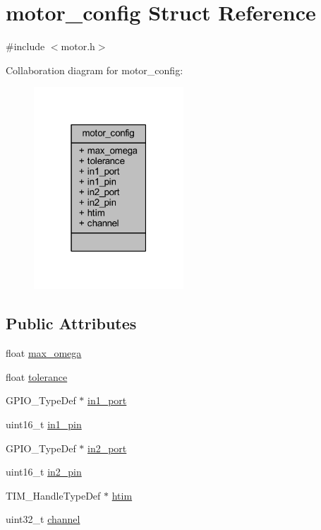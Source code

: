 \hypertarget{structmotor__config}{}\section{motor\+\_\+config Struct Reference}
\label{structmotor__config}


{\ttfamily \#include $<$motor.\+h$>$}



Collaboration diagram for motor\+\_\+config\+:
\nopagebreak
\begin{figure}[H]
\begin{center}
\leavevmode
\includegraphics[width=159pt]{structmotor__config__coll__graph}
\end{center}
\end{figure}
\subsection*{Public Attributes}
\begin{DoxyCompactItemize}
\item 
float \mbox{\hyperlink{structmotor__config_a88fc8ca47e3b231b22a03499cf7dc1c5}{max\+\_\+omega}}
\item 
float \mbox{\hyperlink{structmotor__config_a65896f970ca53f058d57ec2fc5188719}{tolerance}}
\item 
G\+P\+I\+O\+\_\+\+Type\+Def $\ast$ \mbox{\hyperlink{structmotor__config_a954fcd761395de38e251e7052126fe37}{in1\+\_\+port}}
\item 
uint16\+\_\+t \mbox{\hyperlink{structmotor__config_ab96ecf85a5bee0e13f1be1ac799ee24b}{in1\+\_\+pin}}
\item 
G\+P\+I\+O\+\_\+\+Type\+Def $\ast$ \mbox{\hyperlink{structmotor__config_a4b46a55de08e33e2e7a7f255568dfd7b}{in2\+\_\+port}}
\item 
uint16\+\_\+t \mbox{\hyperlink{structmotor__config_ab494f14e301a7553f90ffd25c0ccfe7f}{in2\+\_\+pin}}
\item 
T\+I\+M\+\_\+\+Handle\+Type\+Def $\ast$ \mbox{\hyperlink{structmotor__config_a9926810d168ac02bb71d8da15fbcd10d}{htim}}
\item 
uint32\+\_\+t \mbox{\hyperlink{structmotor__config_a59eeef5fc4909b5bdcc5f98cfd16378a}{channel}}
\end{DoxyCompactItemize}


